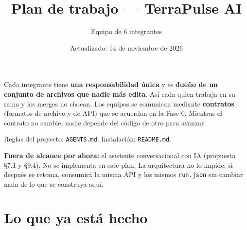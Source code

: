 \documentclass[11pt,a4paper]{article}
\title{Plan de trabajo --- TerraPulse AI}
\author{Equipo de 6 integrantes}
\date{Actualizado: 14 de noviembre de 2026}
\begin{document}
\maketitle

Cada integrante tiene \textbf{una responsabilidad única} y es \textbf{dueño de un conjunto de archivos que nadie más edita}. Así cada
quien trabaja en su rama y los merges no chocan. Los equipos se comunican mediante \textbf{contratos} (formatos de archivo y de API)
que se acuerdan en la Fase 0. Mientras el contrato no cambie, nadie depende del código de otro para avanzar.

Reglas del proyecto: \texttt{AGENTS.md}. Instalación: \texttt{README.md}.

\begin{nota}
\textbf{Fuera de alcance por ahora:} el asistente conversacional con IA (propuesta §7.1 y §9.4). No se implementa en este plan. La
arquitectura no lo impide: si después se retoma, consumirá la misma API y los mismos \texttt{run.json} sin cambiar nada de lo que se
construya aquí.
\end{nota}

\section{Lo que ya está hecho}
\end{document}
